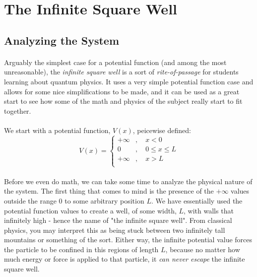 \documentclass[12pt,letterpaper]{book}
\begin{document}

\section{The Infinite Square Well}


\subsection*{Analyzing the System}

\paragraph*{}Arguably the simplest case for a potential function (and among the most unreasonable), the \textit{infinite square well} is a sort of \textit{rite-of-passage} for students learning about quantum physics. It uses a very simple potential function case and allows for some nice simplifications to be made, and it can be used as a great start to see how some of the math and physics of the subject really start to fit together.

\paragraph*{}We start with a potential function, $V(x)$, peicewise defined:
\begin{equation}
\label{ISW potential}
V(x) = \left\{
        \begin{array}{ll}
            +\infty &, \quad x < 0 \\
            0 		&, \quad 0 \leq x \leq L \\
            +\infty &, \quad x > L \\
        \end{array}
    \right.
\end{equation}

\paragraph*{}Before we even do math, we can take some time to analyze the physical nature of the system. The first thing that comes to mind is the presence of the $+\infty$ values outside the range $0$ to some arbitrary position $L$. We have essentially used the potential function values to create a well, of some width, $L$, with walls that infinitely high - hence the name of "the infinite square well". From classical physics, you may interpret this as being stuck between two infinitely tall mountains or something of the sort. Either way, the infinite potential value forces the particle to be confined in this regions of length $L$, because no matter how much energy or force is applied to that particle, it \textit{can never escape} the infinite square well.
\end{document}
